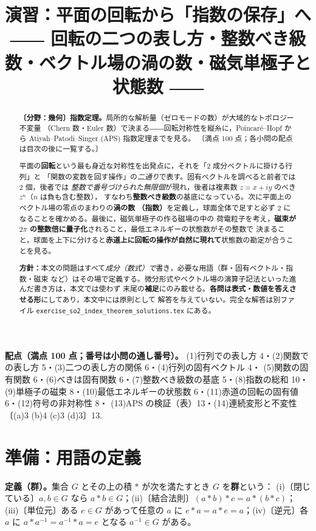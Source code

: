 \documentclass[dvipdfmx, uplatex]{jsarticle}
\title{演習：平面の回転から「指数の保存」へ\\
\large ―― 回転の二つの表し方・整数べき級数・ベクトル場の渦の数・磁気単極子と状態数 ――}
\author{}
\date{}
\theoremstyle{definition}
\begin{document}
\maketitle
\vspace{-6zh}

\begin{abstract}
\sloppy
\textbf{〔分野：幾何〕指数定理。}局所的な解析量（ゼロモードの数）が大域的なトポロジー不変量
（Chern 数・Euler 数）で決まる――回転対称性を縦糸に，Poincar\'e--Hopf から
Atiyah--Patodi--Singer (APS) 指数定理までを見る。
〔満点 100 点；各小問の配点は目次の後に一覧する。〕
\par\smallskip
平面の\textbf{回転}という最も身近な対称性を出発点に，それを「2 成分ベクトルに掛ける行列」と
「関数の変数を回す操作」の\emph{二通り}で表す。固有ベクトルを調べると前者では 2 個，後者では
\emph{整数で番号づけられた無限個}が現れ，後者は複素数 $z=x+iy$ のべき $z^n$（$n$ は負も含む整数），
すなわち\textbf{整数べき級数}の基底になっている。次に平面上のベクトル場の零点のまわりの\textbf{渦の数
（指数）}を定義し，球面全体で足すと必ず $2$ になることを確かめる。最後に，磁気単極子の作る磁場の中の
荷電粒子を考え，\textbf{磁束が $2\pi$ の整数倍に量子化}されること，最低エネルギーの状態数がその整数で
決まること，球面を上下に分けると\textbf{赤道上に回転の操作が自然に現れて}状態数の勘定が合うことを見る。

\textbf{方針：}本文の問題はすべて\emph{成分（数式）で}書き，必要な用語（群・固有ベクトル・指数・磁束
など）はその場で定義する。微分形式やベクトル場の演算子記法といった進んだ書き方は，本文では使わず
末尾の\textbf{補足}にのみ載せる。\textbf{各問は表式・数値を答えさせる形}にしてあり，本文中には原則として
解答を与えていない。完全な解答は別ファイル \texttt{exercise\_so2\_index\_theorem\_solutions.tex} にある。
\end{abstract}

\tableofcontents

\medskip
{\small\sloppy
\noindent\textbf{配点（満点 100 点；番号は小問の通し番号）。}
(1)行列での表し方 4・(2)関数での表し方 5・(3)二つの表し方の関係 6・(4)行列の固有ベクトル 4・
(5)関数の固有関数 6・(6)べきは固有関数 6・(7)整数べき級数の基底 5・(8)指数の総和 10・
(9)単極子の磁束 8・(10)最低エネルギーの状態数 6・(11)赤道の回転の固有値 6・(12)符号の非対称性 8・
(13)APS の検証（表）13・(14)連続変形と不変性〔(a)3 (b)4 (c)3 (d)3〕13.
\par}

\section{準備：用語の定義}
\noindent\textbf{定義（群）。}集合 $G$ とその上の積 $\ast$ が次を満たすとき $G$ を\textbf{群}という：
(i)〔閉じている〕$a,b\in G$ なら $a\ast b\in G$；(ii)〔結合法則〕$(a\ast b)\ast c=a\ast(b\ast c)$；
(iii)〔単位元〕ある $e\in G$ があって任意の $a$ に $e\ast a=a\ast e=a$；(iv)〔逆元〕各 $a$ に
$a\ast a^{-1}=a^{-1}\ast a=e$ となる $a^{-1}\in G$ がある。
\end{document}

